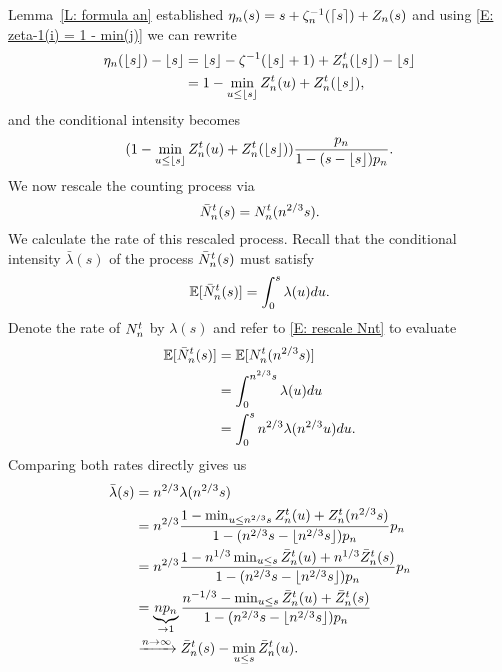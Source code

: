 Lemma~\ref{L: formula an} established $\eta_n(s) = s + \zeta^{-1}_n(\lceil s\rceil) + Z_n(s)$ 
and using \eqref{E: zeta-1(i) = 1 - min(j)} we can rewrite
\begin{equation*}
\begin{aligned}
\eta_n(\lfloor s\rfloor) - \lfloor s\rfloor 
&= \lfloor s\rfloor - \zeta^{-1}(\lfloor s\rfloor+1) + Z_n^t(\lfloor s\rfloor) - \lfloor s\rfloor \\
&= 1 - \min_{u \leq \lfloor s\rfloor} Z_n^t(u) + Z_n^t(\lfloor s\rfloor),
\end{aligned}
\end{equation*}
and the conditional intensity becomes
\begin{equation} \label{E: rate Nnt 2}
(1 - \min_{u \leq \lfloor s\rfloor} Z_n^t(u) + Z_n^t(\lfloor s\rfloor)) \frac{p_n}{1-(s-\lfloor s\rfloor)p_n}.
\end{equation}
We now rescale the counting process via
\begin{equation} \label{E: rescale Nnt}
\bar{N}_n^t(s) = N_n^t(n^{2 / 3}s).
\end{equation}
We calculate the rate of this rescaled process.
Recall that the conditional intensity $\bar{\lambda}(s)$ of the process $\bar{N}_n^t(s)$ must satisfy
\begin{equation}
\mathbb{E}[\bar{N}_n^t(s)] = \int_{0}^{s} \lambda(u) du.
\end{equation}
Denote the rate of $N_n^t$ by $\lambda(s)$ and refer to \eqref{E: rescale Nnt} to evaluate
\begin{equation*}
\begin{aligned}
\mathbb{E}[\bar{N}_n^t(s)]
&= \mathbb{E}[N_n^t(n^{2 / 3}s)] \\
&= \int_{0}^{n^{2 / 3}s} \lambda(u) du \\
&= \int_{0}^{s} n^{2 / 3} \lambda(n^{2 / 3}u) du.
\end{aligned}
\end{equation*}
Comparing both rates directly gives us
\begin{equation*}
\begin{aligned}
\bar{\lambda}(s)
&= n^{2 / 3} \lambda(n^{2 / 3}s) \\
&= n^{2 / 3} \frac{1 - \min_{u \leq n^{2 / 3}s} Z_n^t(u) + Z_n^t(n^{2 / 3}s)}{1 - (n^{2 / 3}s - \lfloor n^{2 / 3}s\rfloor)p_n} p_n \\
&= n^{2 / 3} \frac{1 - n^{1 / 3} \min_{u \leq s} \bar{Z}^t_n(u) + n^{1 / 3}\bar{Z}^t_n(s)}{1 - (n^{2 / 3}s - \lfloor n^{2 / 3}s\rfloor)p_n} p_n \\
&= \underbrace{n p_n}_{\rightarrow 1} \frac{n^{-1 / 3} - \min_{u \leq s} \bar{Z}^t_n(u) + \bar{Z}^t_n(s)}{1 - (n^{2 / 3}s - \lfloor n^{2 / 3}s\rfloor)p_n} \\
&\xrightarrow{n \rightarrow \infty} \bar{Z}^t_n(s) - \min_{u \leq s}\bar{Z}^t_n(u).
\end{aligned}
\end{equation*}

